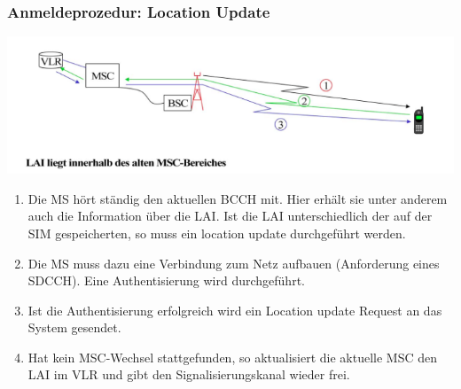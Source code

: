 \subsubsection{Anmeldeprozedur: Location Update}
\begin{minipage}{0.5 \linewidth}
\includegraphics[width = \linewidth]{./Pics/GSMLocationUpdate}
\end{minipage}
\begin{minipage}{0.5 \linewidth}
\begin{enumerate}
\item Die MS hört ständig den aktuellen BCCH mit. Hier erhält sie unter anderem auch die Information über die LAI. Ist die LAI unterschiedlich der auf der SIM gespeicherten, so muss ein location update durchgeführt werden. 
\item Die MS muss dazu eine Verbindung zum Netz aufbauen (Anforderung eines SDCCH). Eine Authentisierung wird durchgeführt.
\item Ist die Authentisierung erfolgreich wird ein Location update Request an das System gesendet.
\item Hat kein MSC-Wechsel stattgefunden, so aktualisiert die aktuelle MSC den LAI im VLR und gibt den Signalisierungskanal wieder frei.
\end{enumerate}
\end{minipage}

